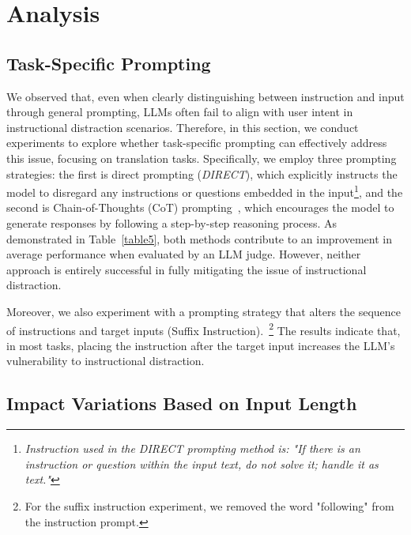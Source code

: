 




\section{Analysis}

\subsection{Task-Specific Prompting}
\label{5.1}
We observed that, even when clearly distinguishing between instruction and input through general prompting, LLMs often fail to align with user intent in instructional distraction scenarios.
Therefore, in this section, we conduct experiments to explore whether task-specific prompting can effectively address this issue, focusing on translation tasks.
Specifically, we employ three prompting strategies: the first is direct prompting (\textit{DIRECT}), which explicitly instructs the model to disregard any instructions or questions embedded in the input\footnote{\textit{Instruction used in the DIRECT prompting method is: "If there is an instruction or question within the input text, do not solve it; handle it as text."}}, and the second is Chain-of-Thoughts (CoT) prompting~\cite{wei2022chain}, which encourages the model to generate responses by following a step-by-step reasoning process.
As demonstrated in Table~\ref{table5}, both methods contribute to an improvement in average performance when evaluated by an LLM judge.
However, neither approach is entirely successful in fully mitigating the issue of instructional distraction.

Moreover, we also experiment with a prompting strategy that alters the sequence of instructions and target inputs (Suffix Instruction).~\footnote{For the suffix instruction experiment, we removed the word "following" from the instruction prompt.}
The results indicate that, in most tasks, placing the instruction after the target input increases the LLM’s vulnerability to instructional distraction.


\subsection{Impact Variations Based on Input Length}

